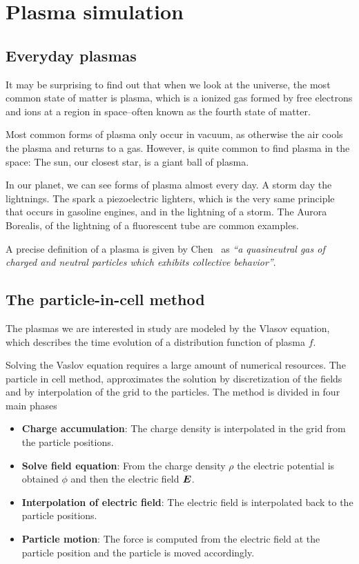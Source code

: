\chapter{Plasma simulation}
\label{ch:plasma-sim}



\section{Everyday plasmas}

It may be surprising to find out that when we look at the universe, the most
common state of matter is plasma, which is a ionized gas formed by free
electrons and ions at a region in space--often known as the fourth state of
matter.

Most common forms of plasma only occur in vacuum, as otherwise the air cools the
plasma and returns to a gas. However, is quite common to find plasma in the 
space: The sun, our closest star, is a giant ball of plasma.

In our planet, we can see forms of plasma almost every day. A storm day the
lightnings. The spark a piezoelectric lighters, which is the very same
principle that occurs in gasoline engines, and in the lightning of a storm.
The Aurora Borealis, of the lightning of a fluorescent tube are common examples.

A precise definition of a plasma is given by Chen~\cite{chen} as \textit{``a
quasineutral gas of charged and neutral particles which exhibits collective
behavior''}.


\section{The particle-in-cell method}

The plasmas we are interested in study are modeled by the Vlasov equation, which 
describes the time evolution of a distribution function of plasma $f$.

Solving the Vaslov equation requires a large amount of numerical resources. The 
particle in cell method, approximates the solution by discretization of the 
fields and by interpolation of the grid to the particles. The method is divided 
in four main phases
%
\begin{itemize}
\item \textbf{Charge accumulation}: The charge density is interpolated in the 
grid from the particle positions.
\item \textbf{Solve field equation}: From the charge density $\rho$ the electric 
potential is obtained $\phi$ and then the electric field $\bm{E}$.
\item \textbf{Interpolation of electric field}: The electric field is  
interpolated back to the particle positions.
\item \textbf{Particle motion}: The force is computed from the electric field at 
the particle position and the particle is moved accordingly.
\end{itemize}
%


